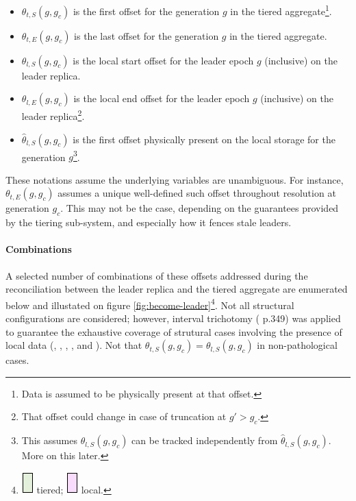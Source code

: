\documentclass{article}
\newcommand*\circled[1]{\tikz[baseline=(char.base)]{
		\node[shape=circle,draw,inner sep=1pt] (char) {#1};}}
\begin{document}
\begin{itemize}
	\item $\theta_{t,S}(g, g_c)$ is the first offset for the generation $g$ in the tiered aggregate\footnote{Data is assumed to be physically present at that offset.}.
	\item $\theta_{t,E}(g, g_c)$ is the last offset for the generation $g$ in the tiered aggregate.
	\item $\theta_{l,S}(g, g_c)$ is the local start offset for the leader epoch $g$ (inclusive) on the leader replica.
	\item $\theta_{l,E}(g, g_c)$ is the local end offset for the leader epoch $g$ (inclusive) on the leader replica\footnote{That offset could change in case of truncation at $g' > g_c$.}.
	\item $\hat{\theta}_{l,S}(g, g_c)$ is the first offset physically present on the local storage for the generation $g$\footnote{This assumes $\theta_{l,S}(g, g_c)$ can be tracked independently from $\hat{\theta}_{l,S}(g, g_c)$. More on this later.}.
\end{itemize} 

These notations assume the underlying variables are unambiguous. For instance, $\theta_{t,E}(g, g_c)$ assumes a unique well-defined such offset throughout resolution at generation $g_c$. This may not be the case, depending on the guarantees provided by the tiering sub-system, and especially how it fences stale leaders.

\paragraph{Combinations}
A selected number of combinations of these offsets addressed during the reconciliation between the leader replica and the tiered aggregate are enumerated below and illustated on figure \ref{fig:become-leader}\footnote{\includegraphics[scale=0.3]{tiered.png} tiered; \includegraphics[scale=0.3]{local.png} local.}. Not all structural configurations are considered; however, interval trichotomy (\cite{CLR} p.349) was applied to guarantee the exhaustive coverage of strutural cases involving the presence of local data (\circled{B}, \circled{C}, \circled{D}, \circled{E}, \circled{F} and \circled{G}). Not that $\theta_{t,S}(g, g_c) = \theta_{l,S}(g, g_c)$ in non-pathological cases.
\end{document}
